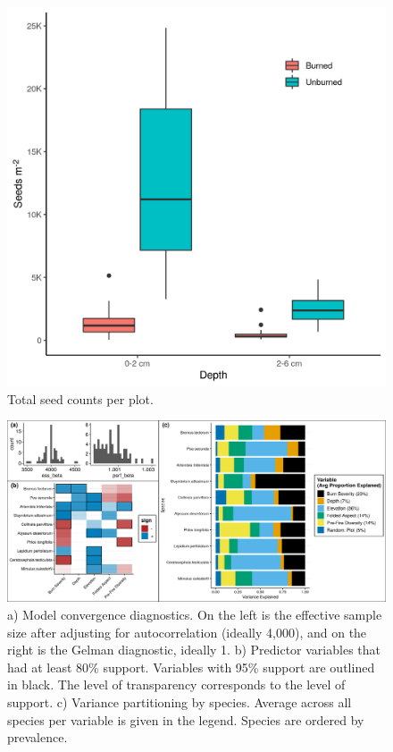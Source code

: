 \documentclass[
  11pt,
]{article}
\begin{document}
\newpage
\newpage

\begin{figure}
\centering
\includegraphics{images/depth_x_burned_counts.png}
\caption{Total seed counts per plot.}
\end{figure}

\newpage

\begin{figure}
\centering
\includegraphics{images/jsdm_stuff.png}
\caption{a) Model convergence diagnostics. On the left is the effective
sample size after adjusting for autocorrelation (ideally 4,000), and on
the right is the Gelman diagnostic, ideally 1. b) Predictor variables
that had at least 80\% support. Variables with 95\% support are outlined
in black. The level of transparency corresponds to the level of support.
c) Variance partitioning by species. Average across all species per
variable is given in the legend. Species are ordered by prevalence.}
\end{figure}
\end{document}
